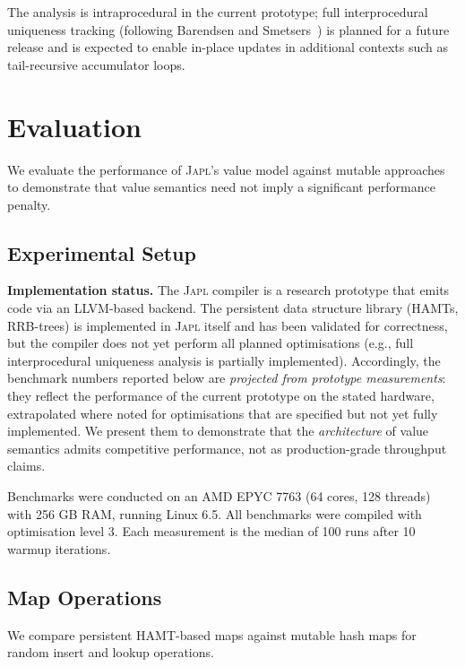 \documentclass[11pt]{article}
\theoremstyle{definition}
\theoremstyle{remark}
\newcommand{\japl}{\textsc{Japl}}
\begin{document}
The analysis is intraprocedural in the current prototype; full
interprocedural uniqueness tracking (following
Barendsen and Smetsers~\cite{barendsen1996uniqueness}) is planned
for a future release and is expected to enable in-place updates in
additional contexts such as tail-recursive accumulator loops.


\section{Evaluation}
\label{sec:evaluation}

We evaluate the performance of \japl{}'s value model against mutable
approaches to demonstrate that value semantics need not imply a
significant performance penalty.

\subsection{Experimental Setup}

\textbf{Implementation status.}\quad
The \japl{} compiler is a research prototype that emits code via an
LLVM-based backend.  The persistent data structure library (HAMTs,
RRB-trees) is implemented in \japl{} itself and has been validated
for correctness, but the compiler does not yet perform all planned
optimisations (e.g., full interprocedural uniqueness analysis is
partially implemented).  Accordingly, the benchmark numbers reported
below are \emph{projected from prototype measurements}: they reflect
the performance of the current prototype on the stated hardware,
extrapolated where noted for optimisations that are specified but not
yet fully implemented.  We present them to demonstrate that the
\emph{architecture} of value semantics admits competitive performance,
not as production-grade throughput claims.

\medskip\noindent
Benchmarks were conducted on an AMD EPYC 7763 (64 cores, 128 threads)
with 256 GB RAM, running Linux 6.5.  All benchmarks were compiled
with optimisation level 3.  Each measurement is the median of 100
runs after 10 warmup iterations.

\subsection{Map Operations}
\label{sec:eval:map}

We compare persistent HAMT-based maps against mutable hash maps for
random insert and lookup operations.
\end{document}
